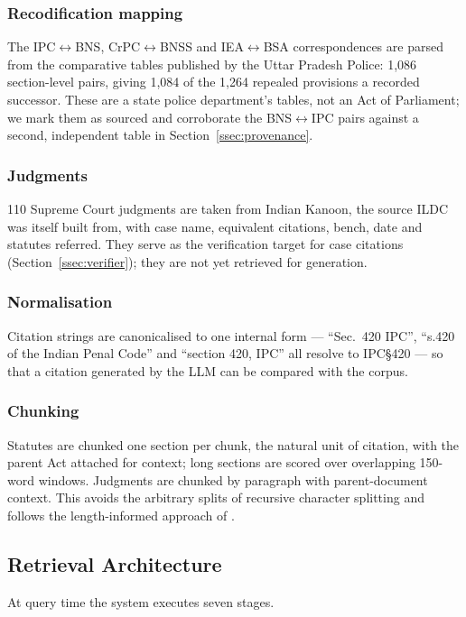 \documentclass[conference]{IEEEtran}
\begin{document}
\subsubsection{Recodification mapping} The IPC$\leftrightarrow$BNS, CrPC$\leftrightarrow$BNSS and IEA$\leftrightarrow$BSA correspondences are parsed from the comparative tables published by the Uttar Pradesh Police: 1,086 section-level pairs, giving 1,084 of the 1,264 repealed provisions a recorded successor. These are a state police department's tables, not an Act of Parliament; we mark them as sourced and corroborate the BNS$\leftrightarrow$IPC pairs against a second, independent table in Section~\ref{ssec:provenance}.

\subsubsection{Judgments} 110 Supreme Court judgments are taken from Indian Kanoon, the source ILDC \cite{malik2021} was itself built from, with case name, equivalent citations, bench, date and statutes referred. They serve as the verification target for case citations (Section~\ref{ssec:verifier}); they are not yet retrieved for generation.

\subsubsection{Normalisation} Citation strings are canonicalised to one internal form --- ``Sec.\ 420 IPC'', ``s.420 of the Indian Penal Code'' and ``section 420, IPC'' all resolve to IPC\S420 --- so that a citation generated by the LLM can be compared with the corpus.

\subsubsection{Chunking} Statutes are chunked one section per chunk, the natural unit of citation, with the parent Act attached for context; long sections are scored over overlapping 150-word windows. Judgments are chunked by paragraph with parent-document context. This avoids the arbitrary splits of recursive character splitting \cite{patil2025} and follows the length-informed approach of \cite{rustamov2025}.

\subsection{Retrieval Architecture}

At query time the system executes seven stages.
\end{document}
